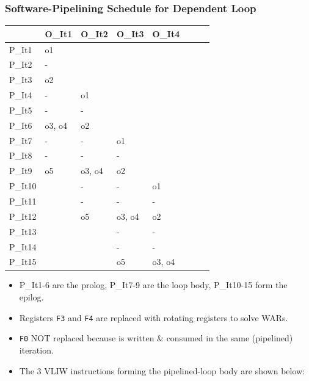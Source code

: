 \documentclass{beamer}
\renewcommand{\emph}[1]{\textcolor{structure}{#1}}
\newcommand{\emp}[1]{\textcolor{DikuRed}{ #1}}
\begin{document}
\begin{frame}[fragile,t]
    \frametitle{Software-Pipelining Schedule for Dependent Loop}

\begin{tiny}
\begin{tabular}{llllllll}
\hline
                 & O\_It1 & O\_It2 & O\_It3 & O\_It4  \\\hline
\emp{P\_It1}     & o1     &        &        &         \\
\emp{P\_It2}     & -      &        &        &         \\
\emp{P\_It3}     & o2     &        &        &         \\
\emp{P\_It4}     & -      & o1     &        &         \\
\emp{P\_It5}     & -      & -      &        &         \\
\emp{P\_It6}     & o3, o4 & o2     &        &         \\
\emph{P\_It7}     & -      & -      & o1     &         \\
\emph{P\_It8}     & -      & -      & -      &         \\
\emph{P\_It9}     & o5     & o3, o4 & o2     &         \\
\emp{P\_It10}    &        & -      & -      & o1      \\
\emp{P\_It11}    &        & -      & -      & -       \\
\emp{P\_It12}    &        & o5     & o3, o4 & o2      \\
\emp{P\_It13}    &        &        & -      & -       \\
\emp{P\_It14}    &        &        & -      & -       \\
\emp{P\_It15}    &        &        & o5     & o3, o4  \\
\end{tabular}
\end{tiny}

\smallskip

\begin{scriptsize}
\begin{itemize}
    \item \emp{P\_It1-6 are the prolog}, \emph{P\_It7-9 are the loop body}, 
          \emp{P\_It10-15 form the epilog.}
        
    \item Registers {\tt F3} and {\tt F4} are replaced with rotating registers
            to solve WARs. 
    \item {\tt F0} NOT replaced because is written \& consumed in
            the same (pipelined) iteration.
    \item The 3 VLIW instructions forming the pipelined-loop body are shown below:
\end  {itemize}
\end{scriptsize}


\end{frame}
\end{document}
